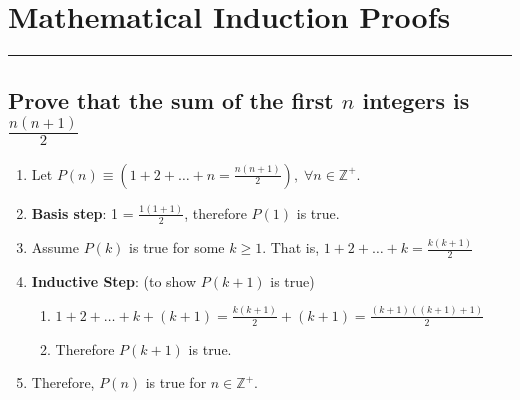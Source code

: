 \documentclass{article}
\begin{document}
\newpage
\begingroup

\renewcommand{\labelenumii}{\arabic{enumi}.\arabic{enumii}}
\renewcommand{\labelenumiii}{\arabic{enumi}.\arabic{enumii}.\arabic{enumiii}}
\renewcommand{\labelenumiv}{\arabic{enumi}.\arabic{enumii}.\arabic{enumiii}.\arabic{enumiv}}

\section*{Mathematical Induction Proofs}
\hrule
\vspace{0.5cm}

\subsection*{Prove that the sum of the first $n$ integers is $\frac{n(n+1)}{2}$}
\begin{enumerate}
	\item Let $P(n)\equiv (1+2+\dots+n=\frac{n(n+1)}{2}),\;\forall n\in \mathbb{Z}^{+}$. 
	\item \textbf{Basis step}: 1 = $\frac{1(1+1)}{2}$, therefore $P(1)$ is true. 
	\item Assume $P(k)$ is true for some $k\geq 1$. That is, $1+2+\dots+k=\frac{k(k+1)}{2}$
	\item \textbf{Inductive Step}: (to show $P(k+1)$ is true)
	\begin{enumerate}
		\item $1+2+\dots+k+(k+1)=\frac{k(k+1)}{2} + (k+1) = \frac{(k+1)((k+1)+1)}{2}$
		\item Therefore $P(k+1)$ is true.
	\end{enumerate}
	\item Therefore, $P(n)$ is true for $n\in \mathbb{Z}^{+}$.
\end{enumerate}

\vspace{0.1cm}
\end{document}
